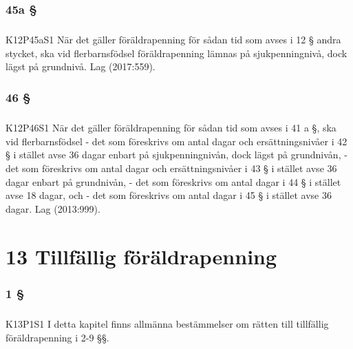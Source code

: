 \documentclass[a4paper,notitlepage,openany,10pt]{book}
\begin{document}
\subsection*{45a §}
\paragraph*{}
{\tiny K12P45aS1}
När det gäller föräldrapenning för sådan tid som avses i 12 § andra stycket, ska vid flerbarnsfödsel föräldrapenning lämnas på sjukpenningnivå, dock lägst på grundnivå.
Lag (2017:559).
\subsection*{46 §}
\paragraph*{}
{\tiny K12P46S1}
När det gäller föräldrapenning för sådan tid som avses i 41 a §, ska vid flerbarnsfödsel
\newline - det som föreskrivs om antal dagar och ersättningsnivåer i 42 § i stället avse 36 dagar enbart på sjukpenningnivån, dock lägst på grundnivån,
\newline - det som föreskrivs om antal dagar och ersättningsnivåer i 43 § i stället avse 36 dagar enbart på grundnivån,
\newline - det som föreskrivs om antal dagar i 44 § i stället avse 18 dagar, och
\newline - det som föreskrivs om antal dagar i 45 § i stället avse 36 dagar.
Lag (2013:999).
\chapter*{13 Tillfällig föräldrapenning}
\subsection*{1 §}
\paragraph*{}
{\tiny K13P1S1}
I detta kapitel finns allmänna bestämmelser om rätten till tillfällig föräldrapenning i 2-9 §§.
\end{document}
